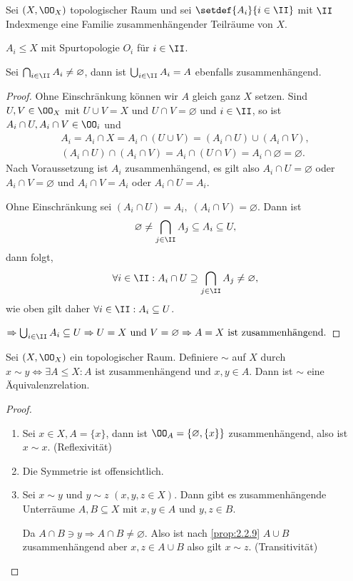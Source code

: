\begin{prop}
\label{prop:2.2.9}
Sei $(X,\OO_X)$ topologischer Raum und sei $\setdef{A_i}{i\in\II}$ mit $\II$
Indexmenge eine Familie zusammenhängender Teilräume von $X$.

$A_i\le X$ mit Spurtopologie $O_i$ für $i\in\II$.

Sei $\bigcap_{i\in\II} A_i \neq\varnothing$, dann ist $\bigcup_{i\in\II} A_i =
A$ ebenfalls zusammenhängend.\fishhere
\end{prop}
\begin{proof}
Ohne Einschränkung können wir $A$ gleich ganz $X$ setzen. Sind $U,V\in\OO_X$
mit $U\cup V = X$ und $U\cap V =\varnothing$ und $i\in\II$, so ist $A_i\cap U,
A_i\cap V\in\OO_i$ und
\begin{align*}
A_i = A_i\cap X = A_i \cap (U\cup V) = (A_i\cap U)\cup(A_i\cap V),\\
(A_i\cap U)\cap(A_i\cap V) = A_i\cap (U\cap V) = A_i \cap \varnothing =
\varnothing.
\end{align*}
Nach Voraussetzung ist $A_i$ zusammenhängend, es gilt also $A_i\cap
U=\varnothing$ oder $A_i\cap V = \varnothing$ und $A_i\cap V = A_i$ oder
$A_i\cap U = A_i$.

Ohne Einschränkung sei $(A_i\cap U)=A_i,\;(A_i\cap V)=\varnothing$. Dann ist
\begin{align*}
\varnothing\neq \bigcap_{j\in\II} A_j \subseteq A_i \subseteq U,
\end{align*}
dann folgt,
\begin{align*}
\forall i\in\II : A_i\cap U \supseteq \bigcap_{j\in\II} A_j\neq \varnothing,
\end{align*}
wie oben gilt daher $\forall i\in\II : A_i\subseteq U$.

$\Rightarrow \bigcup_{i\in\II} A_i\subseteq U \Rightarrow U=X\text{ und
}V=\varnothing\Rightarrow A=X\text{ ist zusammenhängend}.$\qedhere
\end{proof}

\begin{lem}
\label{prop:2.2.10}
Sei $(X,\OO_X)$ ein topologischer Raum. Definiere $\sim$ auf $X$ durch $x\sim y
\Leftrightarrow \exists A\le X : A \text{ ist zusammenhängend und } x,y\in A$.
Dann ist $\sim$ eine Äquivalenzrelation.\fishhere
\end{lem}
\begin{proof}
\begin{enumerate}
  \item Sei $x\in X, A = \{x\}$, dann ist $\OO_A = \{\varnothing, \{x\}\}$ 
  zusammenhängend, also ist $x\sim x$. (Reflexivität)
  \item Die Symmetrie ist offensichtlich.
  \item Sei $x\sim y$ und $y\sim z$ $(x,y,z\in X)$. Dann gibt es
  zusammenhängende Unterräume $A,B\subseteq X$ mit $x,y\in A$ und $y,z\in B$.
  
  Da $A\cap B\ni y\Rightarrow A\cap B\neq \varnothing$. Also ist nach
  \ref{prop:2.2.9} $A\cup B$ zusammenhängend aber $x,z\in A\cup B$ also gilt
  $x\sim z$. (Transitivität)\qedhere
\end{enumerate}
\end{proof}


